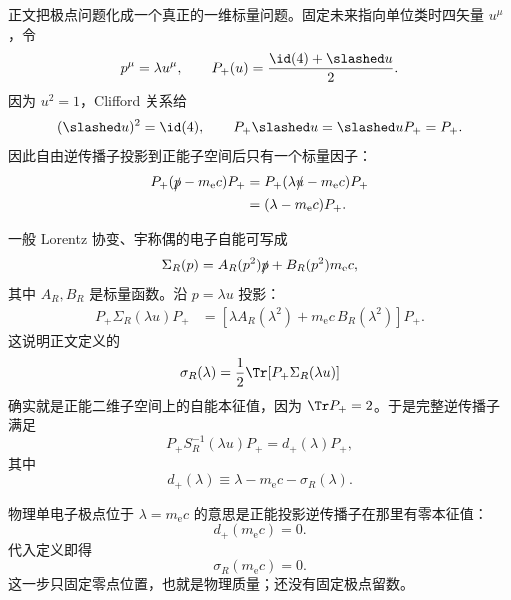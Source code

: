 
\begin{derivation}
正文把极点问题化成一个真正的一维标量问题。固定未来指向单位类时四矢量 $u^\mu$，令
\begin{equation*}
 p^\mu=\lambda u^\mu,
 \qquad
 P_+(u)=\frac{\id(4)+\slashed u}{2}.
\end{equation*}
因为 $u^2=1$，Clifford 关系给
\begin{equation*}
 (\slashed u)^2=\id(4),
 \qquad
 P_+\slashed u=\slashed uP_+=P_+.
\end{equation*}
因此自由逆传播子投影到正能子空间后只有一个标量因子：
\begin{align*}
 P_+(\slashed p-m_{\mathrm e} c)P_+
 &=P_+(\lambda\slashed u-m_{\mathrm e} c)P_+\\
 &=(\lambda-m_{\mathrm e} c)P_+.
\end{align*}

一般 Lorentz 协变、宇称偶的电子自能可写成
\begin{equation*}
 \Sigma_R(p)=A_R(p^2)\slashed p+B_R(p^2)m_{\mathrm e} c,
\end{equation*}
其中 $A_R,B_R$ 是标量函数。沿 $p=\lambda u$ 投影：
\begin{align*}
 P_+\Sigma_R(\lambda u)P_+
 &=\left[\lambda A_R(\lambda^2)+m_{\mathrm e} c\,B_R(\lambda^2)\right]P_+.
\end{align*}
这说明正文定义的
\begin{equation*}
 \sigma_R(\lambda)
 =\frac12\Tr\!\left[P_+\Sigma_R(\lambda u)\right]
\end{equation*}
确实就是正能二维子空间上的自能本征值，因为 $\Tr P_+=2$。于是完整逆传播子满足
\begin{equation*}
 P_+S_R^{-1}(\lambda u)P_+
 =d_+(\lambda)P_+,
\end{equation*}
其中
\begin{equation*}
 d_+(\lambda)
 \equiv\lambda-m_{\mathrm e} c-\sigma_R(\lambda).
\end{equation*}

物理单电子极点位于 $\lambda=m_{\mathrm e} c$ 的意思是正能投影逆传播子在那里有零本征值：
\begin{equation*}
 d_+(m_{\mathrm e} c)=0.
\end{equation*}
代入定义即得
\begin{equation*}
 \sigma_R(m_{\mathrm e} c)=0.
\end{equation*}
这一步只固定零点位置，也就是物理质量；还没有固定极点留数。


\end{derivation}
